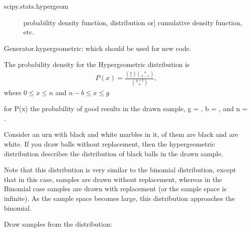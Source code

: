 \documentclass[letterpaper,10pt,english]{sphinxmanual}
\begin{document}
\begin{fulllineitems}
\begin{description}
\end{description}
\begin{description}
\item[{scipy.stats.hypergeom}] \leavevmode{[}probability density function, distribution or{]}
cumulative density function, etc.

\end{description}

Generator.hypergeometric: which should be used for new code.

The probability density for the Hypergeometric distribution is
\begin{equation*}
\begin{split}P(x) = \frac{\binom{g}{x}\binom{b}{n-x}}{\binom{g+b}{n}},\end{split}
\end{equation*}
where \(0 \le x \le n\) and \(n-b \le x \le g\)

for P(x) the probability of  good results in the drawn sample,
g = , b = , and n = .

Consider an urn with black and white marbles in it,  of them
are black and  are white. If you draw  balls without
replacement, then the hypergeometric distribution describes the
distribution of black balls in the drawn sample.

Note that this distribution is very similar to the binomial
distribution, except that in this case, samples are drawn without
replacement, whereas in the Binomial case samples are drawn with
replacement (or the sample space is infinite). As the sample space
becomes large, this distribution approaches the binomial.

Draw samples from the distribution:

\begin{sphinxVerbatim}[commandchars=\\\{\}]
      
     
   
\end{sphinxVerbatim}


\end{fulllineitems}
\end{document}
